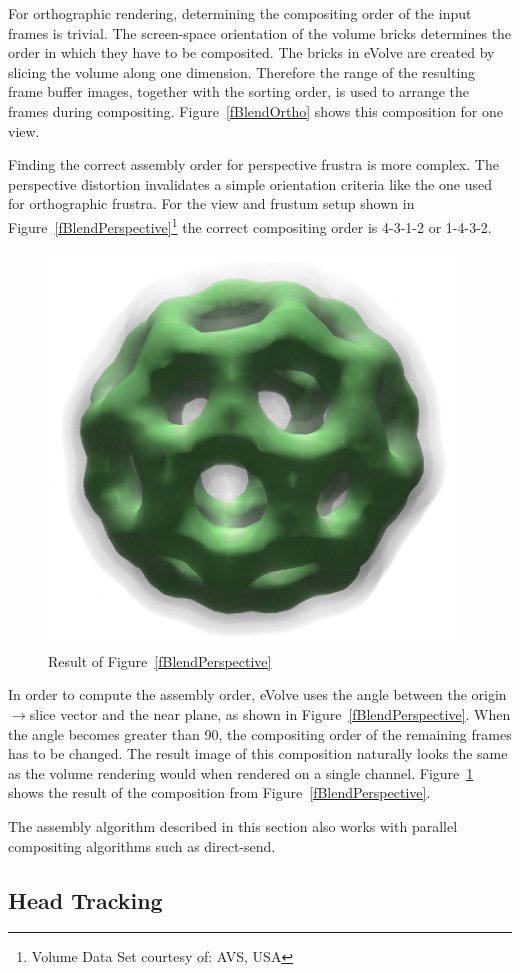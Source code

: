 \documentclass[10pt,a4]{scrartcl}
\newcommand{\fig}[1]{Figure~\ref{#1}}
\begin{document}
For orthographic rendering, determining the compositing order of the
input frames is trivial. The screen-space orientation of the volume
bricks determines the order in which they have to be composited. The
bricks in \textsf{eVolve} are created by slicing the volume along one
dimension. Therefore the range of the resulting frame buffer images,
together with the sorting order, is used to arrange the frames during
compositing. \fig{fBlendOrtho} shows this composition for one view.

Finding the correct assembly order for perspective frustra is more
complex. The perspective distortion invalidates a simple orientation
criteria like the one used for orthographic frustra. For the view and
frustum setup shown in \fig{fBlendPerspective}\footnote{Volume Data Set
  courtesy of: AVS, USA} the correct compositing order is 4-3-1-2 or
1-4-3-2.

\begin{figure}
  \vspace{-4ex}\includegraphics[width=.382\textwidth]{images/volResult.png}
  {\caption{\small\label{fVolResult}Result of \fig{fBlendPerspective}}}
\end{figure}
In order to compute the assembly order, \textsf{eVolve} uses the angle
between the origin$\rightarrow$slice vector and the near plane, as shown
in \fig{fBlendPerspective}. When the angle becomes greater than
90\textdegree, the compositing order of the remaining frames has to be
changed. The result image of this composition naturally looks the same
as the volume rendering would when rendered on a single
channel. \fig{fVolResult} shows the result of the composition from
\fig{fBlendPerspective}.

The assembly algorithm described in this section also works with parallel
compositing algorithms such as direct-send. 

\subsection{\label{sTracking}Head Tracking}
\end{document}
